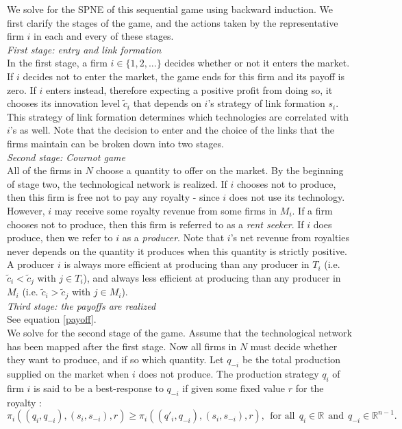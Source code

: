 \documentclass{article}
\begin{document}
\indent We solve for the SPNE of this sequential game using backward induction. We first clarify the stages of the game, and the actions taken by the representative firm $i$ in each and every of these stages. \\

\textit{First stage: entry and link formation }\\

\indent In the first stage, a firm $i\in \{1,2,...\}$ decides whether or not it enters the market. If $i$ decides not to enter the market, the game ends for this firm and its payoff is zero. If $i$ enters instead, therefore expecting a positive profit from doing so, it chooses its innovation level $\tilde{c}_i$ that depends on $i$'s strategy of link formation $s_i$. This strategy of link formation determines which technologies are correlated with $i$'s as well. Note that the decision to enter and the choice of the links that the firms maintain can be broken down into two stages. \\

\textit{Second stage: Cournot game }\\

\indent All of the firms in $N$ choose a quantity to offer on the market. By the beginning of stage two, the technological network  is realized. If $i$ chooses not to produce, then this firm is free not to pay any royalty - since $i$ does not use its technology. However, $i$ may receive some royalty revenue from some firms in $M_i$. If a firm chooses not to produce, then this firm is referred to as a \textit{rent seeker}. If $i$ does produce, then we refer to $i$ as a \textit{producer}. Note that $i$'s net revenue from royalties never depends on the quantity it produces when this quantity is strictly positive. A producer $i$ is always more efficient at producing than any producer in $T_i$ (i.e. $\tilde{c}_i<\tilde{c}_j$ with $j\in T_i$), and always less efficient at producing than any producer in $M_i$ (i.e. $\tilde{c}_i>\tilde{c}_j$ with $j\in M_i$).  \\

\textit{Third stage: the payoffs are realized}\\

See equation \ref{payoff}. \\

\indent We solve for the second stage of the game. Assume that the technological network  has been mapped after the first stage. Now all firms in $N$ must decide whether they want to produce, and if so which quantity. Let $q_{-i}$ be the total production supplied on the market when $i$ does not produce. The production strategy $q_i$ of firm $i$ is said to be a best-response to $q_{-i}$ if given some fixed value $r$ for the royalty : 
\begin{equation}
\pi_i((q_i,q_{-i}), (s_i,s_{-i}),r)\geq \pi_i((q'_i,q_{-i}), (s_i,s_{-i}), r),~~\text{for all}~~q_i\in \mathbb{R}~~\text{and}~~q_{-i}\in \mathbb{R}^{n-1}.
\end{equation}
\end{document}
